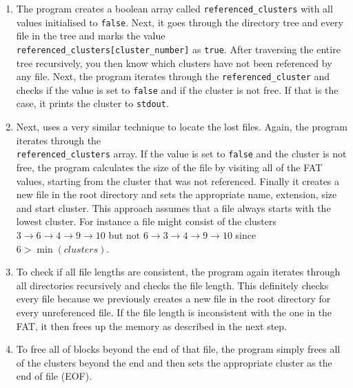 \documentclass[10pt,a4paper]{article}
\begin{document}
\begin{enumerate}
  \item The program creates a boolean array called \texttt{referenced\_clusters} with all values initialised to \texttt{false}. Next, it goes through the directory tree and every file in the tree and marks the value\\\texttt{referenced\_clusters[cluster\_number]} as \texttt{true}.
  After traversing the entire tree recursively, you then know which clusters have not been referenced by any file. Next, the program iterates through the \texttt{referenced\_cluster} and checks if the value is set to \texttt{false} and if the cluster is not free.
  If that is the case, it prints the cluster to \texttt{stdout}.

  \item Next, uses a very similar technique to locate the lost files. Again, the program iterates through the \\\texttt{referenced\_clusters} array.
  If the value is set to \texttt{false} and the cluster is not free, the program calculates the size of the file by visiting all of the FAT values, starting from the cluster that was not referenced.
  Finally it creates a new file in the root directory and sets the appropriate name, extension, size and start cluster.
  This approach assumes that a file always starts with the lowest cluster. For instance a file might consist of the clusters $3 \rightarrow 6 \rightarrow 4 \rightarrow 9 \rightarrow 10$ but not $6 \rightarrow 3 \rightarrow 4 \rightarrow 9 \rightarrow 10$ since $6 > \min(clusters)$.

  \item To check if all file lengths are consistent, the program again iterates through all directories recursively and checks the file length. This definitely checks every file because we previously creates a new file in the root directory for every unreferenced file.
  If the file length is inconsistent with the one in the FAT, it then frees up the memory as described in the next step.

  \item To free all of blocks beyond the end of that file, the program simply frees all of the clusters beyond the end and then sets the appropriate cluster as the end of file (EOF).
\end{enumerate}
\end{document}
